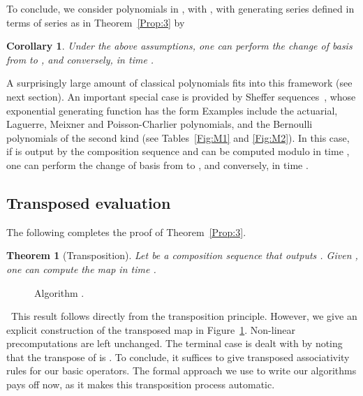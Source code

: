 \documentclass{sig-alternate}
\def\myproof{\noindent{\sc Proof.}~}
\newtheorem{theorem}{Theorem}
\newtheorem{Coro}{Corollary}
\begin{document}
To conclude, we consider polynomials  in ,
with , with generating series defined in terms of series  as in
Theorem~\ref{Prop:3} by
 
\begin{Coro}
   Under the above assumptions, one can \sloppy perform the change of basis
   from  to , and conversely, in
   time .
\end{Coro}
A surprisingly large amount of classical polynomials fits into this
framework (see next section). An important special case is provided
by Sheffer sequences~\cite[Chap.~2]{Roman05},
whose exponential generating function has the form
 Examples
include the actuarial, Laguerre, Meixner and Pois\-son-Charlier
polynomials, and the Bernoulli polynomials of the second kind (see
Tables~\ref{Fig:M1} and \ref{Fig:M2}). In this case, if  is output
by the composition sequence  and  can be computed modulo
 in time , one can perform the change of basis from
 to , and conversely, in time
.







\subsection{Transposed evaluation}   \label{ssec:transposition}

The following completes the proof of Theorem~\ref{Prop:3}.
\begin{theorem}[Transposition]\label{Prop:4}
 Let  be a composition sequence that outputs . Given , one can compute the map
  in time .
\end{theorem}


\begin{figure}[t]
\begin{center}
\fbox{
\begin{minipage}{5 cm}
\begin{tabbing}
\= \quad\quad\quad\quad\quad\quad \= \quad \= \quad \kill
\1mm]
\>  \\
\> {\sf return} 
\end{tabbing}
\end{minipage}
}
\end{center}
\caption{Algorithm .}
\label{Fig:2}
\end{figure}


\myproof This result follows directly from the transposition
principle. However, we give an explicit construction of the transposed
map  in Figure~\ref{Fig:2}. Non-linear
precomputations are left unchanged. The terminal case  is
dealt with by noting that the transpose of  is
.  To conclude, it suffices to give transposed
associativity rules for our basic operators. The formal approach we
use to write our algorithms pays off now, as it makes this
transposition process automatic.
\end{document}
